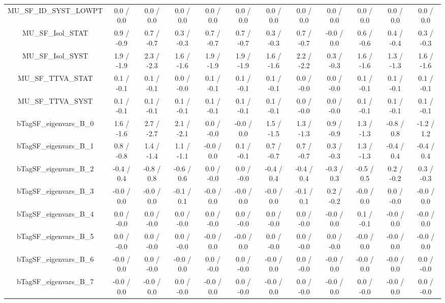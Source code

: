 \begin{table}[htbp]
\begin{center}
\begin{tabular}{|c|c|c|c|c|c|c|c|c|c|c|c|}
  MU_SF_ID_SYST_LOWPT & 0.0 / 0.0 & 0.0 / 0.0 & 0.0 / 0.0 & 0.0 / 0.0 & 0.0 / 0.0 & 0.0 / 0.0 & 0.0 / 0.0 & 0.0 / 0.0 & 0.0 / 0.0 & 0.0 / 0.0 & 0.0 / 0.0 \\ 
  MU_SF_Isol_STAT & 0.9 / -0.9 & 0.7 / -0.7 & 0.3 / -0.3 & 0.7 / -0.7 & 0.7 / -0.7 & 0.3 / -0.3 & 0.7 / -0.7 & -0.0 / 0.0 & 0.6 / -0.6 & 0.4 / -0.4 & 0.3 / -0.3 \\ 
  MU_SF_Isol_SYST & 1.9 / -1.9 & 2.3 / -2.3 & 1.6 / -1.6 & 1.9 / -1.9 & 1.9 / -1.9 & 1.6 / -1.6 & 2.2 / -2.2 & 0.3 / -0.3 & 1.6 / -1.6 & 1.3 / -1.3 & 1.6 / -1.6 \\ 
  MU_SF_TTVA_STAT & 0.1 / -0.1 & 0.1 / -0.1 & 0.0 / -0.0 & 0.1 / -0.1 & 0.1 / -0.1 & 0.1 / -0.1 & 0.0 / -0.0 & 0.0 / -0.0 & 0.1 / -0.1 & 0.1 / -0.1 & 0.1 / -0.1 \\ 
  MU_SF_TTVA_SYST & 0.1 / -0.1 & 0.1 / -0.1 & 0.1 / -0.1 & 0.1 / -0.1 & 0.1 / -0.1 & 0.1 / -0.1 & 0.0 / -0.0 & 0.0 / -0.0 & 0.1 / -0.1 & 0.1 / -0.1 & 0.1 / -0.1 \\ 
  bTagSF_eigenvars_B_0 & 1.6 / -1.6 & 2.7 / -2.7 & 2.1 / -2.1 & 0.0 / -0.0 & -0.0 / 0.0 & 1.5 / -1.5 & 1.3 / -1.3 & 0.9 / -0.9 & 1.3 / -1.3 & -0.8 / 0.8 & -1.2 / 1.2 \\ 
  bTagSF_eigenvars_B_1 & 0.8 / -0.8 & 1.4 / -1.4 & 1.1 / -1.1 & -0.0 / 0.0 & 0.1 / -0.1 & 0.7 / -0.7 & 0.7 / -0.7 & 0.3 / -0.3 & 1.3 / -1.3 & -0.4 / 0.4 & -0.4 / 0.4 \\ 
  bTagSF_eigenvars_B_2 & -0.4 / 0.4 & -0.8 / 0.8 & -0.6 / 0.6 & 0.0 / -0.0 & 0.0 / -0.0 & -0.4 / 0.4 & -0.4 / 0.4 & -0.3 / 0.3 & -0.5 / 0.5 & 0.2 / -0.2 & 0.3 / -0.3 \\ 
  bTagSF_eigenvars_B_3 & -0.0 / 0.0 & -0.0 / 0.0 & -0.1 / 0.1 & -0.0 / 0.0 & -0.0 / 0.0 & -0.0 / 0.0 & -0.1 / 0.1 & 0.2 / -0.2 & -0.0 / 0.0 & 0.0 / -0.0 & -0.0 / 0.0 \\ 
  bTagSF_eigenvars_B_4 & 0.0 / -0.0 & 0.0 / -0.0 & 0.0 / -0.0 & 0.0 / -0.0 & 0.0 / -0.0 & 0.0 / -0.0 & 0.0 / -0.0 & -0.0 / 0.0 & 0.1 / -0.1 & -0.0 / 0.0 & -0.0 / 0.0 \\ 
  bTagSF_eigenvars_B_5 & 0.0 / -0.0 & 0.0 / -0.0 & 0.0 / -0.0 & -0.0 / 0.0 & -0.0 / 0.0 & 0.0 / -0.0 & 0.0 / -0.0 & 0.0 / -0.0 & -0.0 / 0.0 & -0.0 / 0.0 & -0.0 / 0.0 \\ 
  bTagSF_eigenvars_B_6 & -0.0 / 0.0 & 0.0 / -0.0 & -0.0 / 0.0 & 0.0 / -0.0 & 0.0 / -0.0 & -0.0 / 0.0 & 0.0 / -0.0 & -0.0 / 0.0 & -0.0 / 0.0 & -0.0 / 0.0 & 0.0 / -0.0 \\ 
  bTagSF_eigenvars_B_7 & -0.0 / 0.0 & -0.0 / 0.0 & 0.0 / -0.0 & -0.0 / 0.0 & 0.0 / -0.0 & -0.0 / 0.0 & 0.0 / -0.0 & -0.0 / 0.0 & 0.0 / -0.0 & -0.0 / 0.0 & 0.0 / -0.0 \\ 

\end{tabular}
\end{center}
\end{table}
